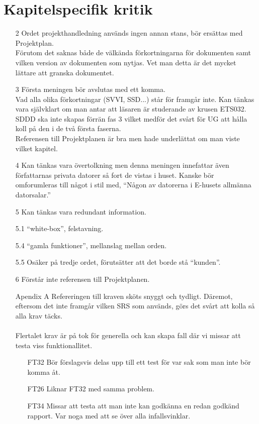 \documentclass[a4paper]{article}
\begin{document}
\section{Kapitelspecifik kritik}
\begin{itemize}
\item[2] Ordet projekthandledning används ingen annan stans, bör ersättas med Projektplan.\\
Förutom det saknas både de välkända förkortningarna för dokumenten samt vilken version av dokumenten som nytjas. Vet man detta är det mycket lättare att granska dokumentet.

\item[3] Första meningen bör avslutas med ett komma. \\
Vad alla olika förkortningar (SVVI, SSD...) står för framgår inte. Kan tänkas vara självklart om man antar att läsaren är studerande av krusen ETS032. \\
SDDD ska inte skapas förrän fas 3 vilket medför det svårt för UG att hålla koll på den i de två första faserna.\\
Referensen till Projektplanen är bra men hade underlättat om man viste vilket kapitel.

\item[4]
Kan tänkas vara övertolkning men denna meningen innefattar även författarnas privata datorer så fort de vistas i huset. Kanske bör omforumleras till något i stil med, ``Någon av datorerna i E-husets allmänna 
datorsalar.''

\item[5] Kan tänkas vara redundant information.

\item[5.1] ``white-box'', felstavning.

\item[5.4] ``gamla funktioner'', mellanslag mellan orden.

\item[5.5] Osäker på tredje ordet, förutsätter att det borde stå ``kunden''.

\item[6] Förstår inte referensen till Projektplanen.

\item[Apendix A] Refereringen till kraven sköts snyggt och tydligt. Däremot, eftersom det inte framgår vilken SRS som används, görs det svårt att kolla så alla krav täcks.\\
\\
Flertalet krav är på tok för generella och kan skapa fall där vi missar att testa viss funktionallitet.

\begin{itemize}
\item[FT32] Bör förslagsvis delas upp till ett test för var sak som man inte bör komma åt.
\item[FT26] Liknar FT32 med samma problem.
\item[FT34] Missar att testa att man inte kan godkänna en redan godkänd rapport. Var noga med att se över alla infallsvinklar.
\end{itemize}

\end{itemize}
\end{document}
